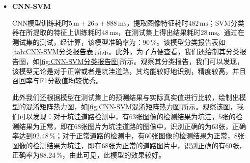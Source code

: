 \documentclass{MathorCupmodeling}
\begin{document}
\begin{itemize}
	观察该表，我们可以发现，该模型在新数据集上表现效果较优秀，各项指标均较为理想。此外，我们还绘制其在训练过程中在训练集及测试集上的准确率与损失值，如\textcolor{blue}{\cref{fig:CNN训练结果}}所示。通过观察该图，我们可以发现，随着迭代次数的增加，训练集上的准确率平稳二缓慢增加，测试集上的准确度经过起伏后也为上升趋势。而随着迭代次数增加，其训练集上的损失逐渐减少，而在测试集上其损失呈波动性，这可能是由于数据集过少，即缺乏代表性样本\textcolor{blue}{\cite{数据挖掘导论}}，易造成过拟合。

	\begin{figure}[H]
		\centering
		\texttt{[image: CNN训练结果.pdf]}
		\caption{CNN训练结果}
		\label{fig:CNN训练结果}
	\end{figure}
		\item \textbf{CNN-SVM}
		
		CNN模型训练耗时$5\,\text{m}+26\,\text{s}+888\,\text{ms}$，提取图像特征耗时$482\,\text{ms}$；SVM分类器在所提取的特征上训练耗时$48\,\text{ms}$，在测试集上得出结果耗时$28\,\text{ms}$。通过在测试集的测试，经计算，该模型准确率为：$90\,\%$。该模型分类报告表如\textcolor{blue}{\cref{tab:CNN-SVM分类报告表}}所示。此外，为了方便查看，我们还绘制其分类报告图，如\textcolor{blue}{\cref{fig:CNN-SVM分类报告图}}所示。观察其分类报告，我们可以发现，该模型无论是对于正常或者是坑洼道路，其均能较好地识别，精度较高，并且召回率与F1分数值均较优秀。
\begin{table}[htbp]
	\centering
	\caption{CNN-SVM分类报告表}
	\label{tab:CNN-SVM分类报告表}
  \end{table}

  	此外我们还根据模型在测试集上的预测结果与实际真实值进行比较，绘制出模型的混淆矩阵热力图，如\textcolor{blue}{\cref{fig:CNN-SVM混淆矩阵热力图}}所示。观察该图，我们可以发现：对于坑洼道路检测中，有$63$张图像的检测结果为坑洼，$5$张的检测结果为正常，即在$68$张图片为坑洼道路的图像中，识别正确的为$63$张，正确率达到$92.48\,\%$；对于正常道路的检测中，有$60$张图像的检测结果为正常，$8$张图像的检测结果为坑洼，即在$68$张为正常的道路图片中，识别正确的有$60$张，正确率为$88.24\,\%$，由此可见，此模型的效果较好。


\end{itemize}
\end{document}
